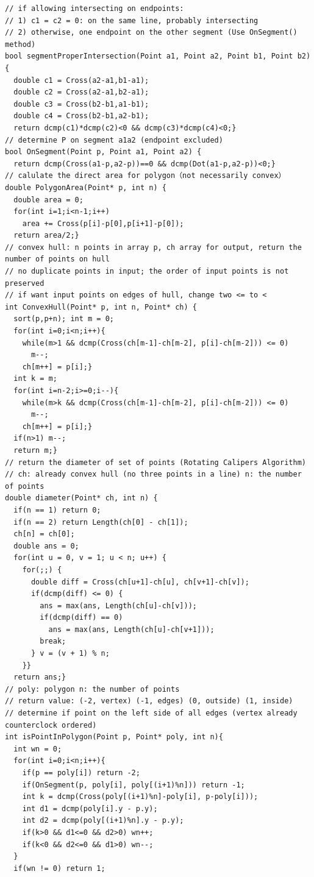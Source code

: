 \documentclass[10pt,landscape]{article}
\begin{document}
\begin{multicols}{2}
\begin{lstlisting}
// if allowing intersecting on endpoints: 
// 1) c1 = c2 = 0: on the same line, probably intersecting
// 2) otherwise, one endpoint on the other segment (Use OnSegment() method)
bool segmentProperIntersection(Point a1, Point a2, Point b1, Point b2){
  double c1 = Cross(a2-a1,b1-a1); 
  double c2 = Cross(a2-a1,b2-a1);
  double c3 = Cross(b2-b1,a1-b1); 
  double c4 = Cross(b2-b1,a2-b1);
  return dcmp(c1)*dcmp(c2)<0 && dcmp(c3)*dcmp(c4)<0;}
// determine P on segment a1a2 (endpoint excluded)
bool OnSegment(Point p, Point a1, Point a2) {
  return dcmp(Cross(a1-p,a2-p))==0 && dcmp(Dot(a1-p,a2-p))<0;}
// calulate the direct area for polygon（not necessarily convex）
double PolygonArea(Point* p, int n) {
  double area = 0;
  for(int i=1;i<n-1;i++)
    area += Cross(p[i]-p[0],p[i+1]-p[0]);
  return area/2;}
// convex hull: n points in array p, ch array for output, return the number of points on hull
// no duplicate points in input; the order of input points is not preserved
// if want input points on edges of hull, change two <= to <
int ConvexHull(Point* p, int n, Point* ch) {
  sort(p,p+n); int m = 0;
  for(int i=0;i<n;i++){
    while(m>1 && dcmp(Cross(ch[m-1]-ch[m-2], p[i]-ch[m-2])) <= 0)
      m--;
    ch[m++] = p[i];}
  int k = m;
  for(int i=n-2;i>=0;i--){
    while(m>k && dcmp(Cross(ch[m-1]-ch[m-2], p[i]-ch[m-2])) <= 0)
      m--;
    ch[m++] = p[i];}
  if(n>1) m--;
  return m;}
// return the diameter of set of points (Rotating Calipers Algorithm) 
// ch: already convex hull (no three points in a line) n: the number of points
double diameter(Point* ch, int n) {
  if(n == 1) return 0;
  if(n == 2) return Length(ch[0] - ch[1]);
  ch[n] = ch[0];
  double ans = 0;
  for(int u = 0, v = 1; u < n; u++) {
    for(;;) {
      double diff = Cross(ch[u+1]-ch[u], ch[v+1]-ch[v]);
      if(dcmp(diff) <= 0) {
        ans = max(ans, Length(ch[u]-ch[v]));
        if(dcmp(diff) == 0)
          ans = max(ans, Length(ch[u]-ch[v+1]));
        break;
      } v = (v + 1) % n;
    }}
  return ans;}
// poly: polygon n: the number of points
// return value: (-2, vertex) (-1, edges) (0, outside) (1, inside)
// determine if point on the left side of all edges (vertex already counterclock ordered)
int isPointInPolygon(Point p, Point* poly, int n){
  int wn = 0;
  for(int i=0;i<n;i++){
    if(p == poly[i]) return -2;
    if(OnSegment(p, poly[i], poly[(i+1)%n])) return -1;
    int k = dcmp(Cross(poly[(i+1)%n]-poly[i], p-poly[i]));
    int d1 = dcmp(poly[i].y - p.y);
    int d2 = dcmp(poly[(i+1)%n].y - p.y);
    if(k>0 && d1<=0 && d2>0) wn++;
    if(k<0 && d2<=0 && d1>0) wn--;
  }
  if(wn != 0) return 1;

\end{lstlisting}
\end{multicols}
\end{document}
